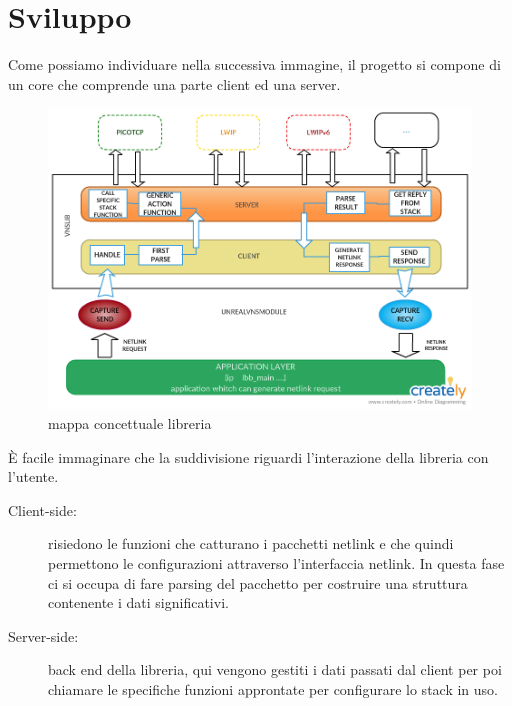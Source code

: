 \documentclass[14pt,a4paper,openright,twoside]{extreport}
\begin{document}
\section{Sviluppo}
Come possiamo individuare nella successiva immagine, il progetto si compone di un core che comprende una parte client ed una server.\\

\begin{figure}[h]                       %
\begin{center}                          %
\includegraphics[width=15cm]{vnslib_scheme}%
%
\caption[mappa concettuale libreria]{mappa concettuale libreria}\label{fig:map}
\end{center}
\end{figure}
\`E facile immaginare che la suddivisione riguardi l'interazione della libreria con l'utente.
\begin{description}                     %
  \item[Client-side:] risiedono le funzioni che catturano i pacchetti netlink e che quindi permettono le configurazioni attraverso l'interfaccia netlink. In questa fase ci si occupa di fare parsing del pacchetto per costruire una struttura contenente i dati significativi.
  \item[Server-side:] back end della libreria, qui vengono gestiti i dati passati dal client per poi chiamare le specifiche funzioni approntate per configurare lo stack in uso.
\end{description}
\end{document}
